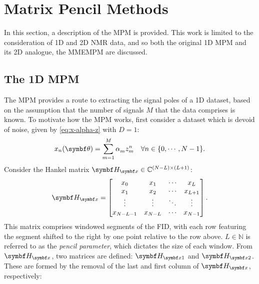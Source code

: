\section{Matrix Pencil Methods}
\label{sec:mpm}
In this section, a description of the \ac{MPM} is provided. This work is
limited to the consideration of \ac{1D} and \ac{2D} \ac{NMR} data, and so both
the original \ac{1D} \ac{MPM} and its \ac{2D} analogue, the \ac{MMEMPM} are
discussed.

\subsection{The 1D MPM}
\label{subsec:mpm}
The \ac{MPM} provides a route to extracting the signal poles of a \ac{1D}
dataset, based on the assumption that the number of signals $M$ that the data
comprises is known\cite{Hua1990,Hua1990b,Hua1991}.
To motivate how the \ac{MPM} works, first consider a dataset which is devoid of
noise, given by \cref{eq:x-alpha-z} with $D=1$:
\begin{equation}
    x_n(\bth) = \sumM \alpha_m^{\vphantom{n}} z_m^n
    \quad \forall n \in \lbrace 0, \cdots, N-1 \rbrace.
\end{equation}
Consider the Hankel matrix $\Hx \in \mathbb{C}^{(N-L) \times (L+1)}$:
\begin{equation}
    \Hx =
    \begin{bmatrix}
        x_0 & x_1 & \cdots & x_L\\
        x_1 & x_2 & \cdots & x_{L+1}\\
        \vdots & \vdots & \ddots & \vdots\\
        x_{N-L-1} & x_{N-L} & \cdots & x_{N-1}
    \end{bmatrix}.
\end{equation}
This matrix comprises windowed segments of the FID, with each row featuring
the segment shifted to the right by one point relative to the row above.
$L \in \mathbb{N}$ is referred to as the \emph{pencil parameter}, which
dictates the size of each window. From $\Hx$, two matrices are defined:
$\Hxone$ and $\Hxtwo$.  These are formed by the removal of the last and first
column of $\Hx$, respectively:

